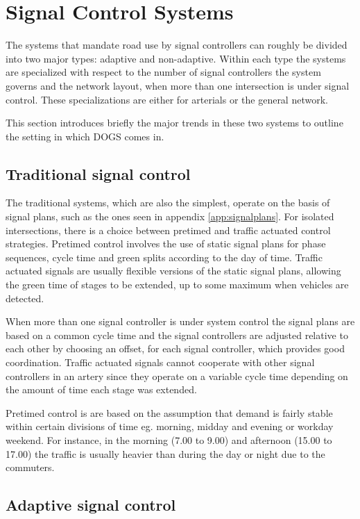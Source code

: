 \section{Signal Control Systems}
The systems that mandate road use by signal controllers can roughly be divided into two major types: adaptive and non-adaptive. Within each type the systems are specialized with respect to the number of signal controllers the system governs and the network layout, when more than one intersection is under signal control. These specializations are either for arterials or the general network.

This section introduces briefly the major trends in these two systems to outline the setting in which DOGS comes in.

\subsection{Traditional signal control}

The traditional systems, which are also the simplest, operate on the basis of signal plans, such as the ones seen in appendix \ref{app:signalplans}. For isolated intersections, there is a choice between pretimed and traffic actuated control strategies. Pretimed control involves the use of static signal plans for phase sequences, cycle time and green splits according to the day of time. Traffic actuated signals are usually flexible versions of the static signal plans, allowing the green time of stages to be extended, up to some maximum when vehicles are detected.

When more than one signal controller is under system control the signal plans are based on a common cycle time and the signal controllers are adjusted relative to each other by choosing an offset, for each signal controller, which provides good coordination. Traffic actuated signals cannot cooperate with other signal controllers in an artery since they operate on a variable cycle time depending on the amount of time each stage was extended.

Pretimed control is are based on the assumption that demand is fairly stable within certain divisions of time eg. morning, midday and evening or workday \/ weekend. For instance, in the morning (7.00 to 9.00) and afternoon (15.00 to 17.00) the traffic is usually heavier than during the day or night due to the commuters.

\subsection{Adaptive signal control}

